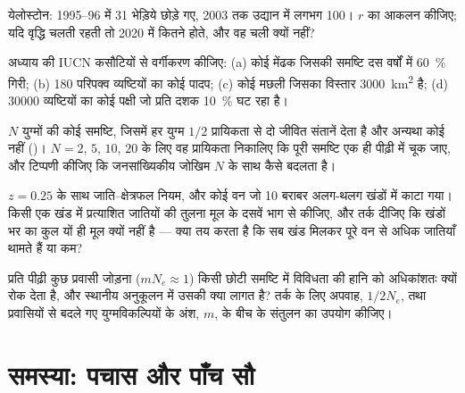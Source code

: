 \begin{exercise}[$\star\star$]\label{exo:b3:conservation-biology:8}
येलोस्टोन: 1995--96 में 31 भेड़िये छोड़े गए, 2003 तक उद्यान में लगभग
100। $r$ का आकलन कीजिए; यदि वृद्धि चलती रहती तो 2020 में कितने होते, और
वह चली क्यों नहीं?
\end{exercise}

\begin{exercise}[$\star\star$]\label{exo:b3:conservation-biology:9}
अध्याय की IUCN कसौटियों से वर्गीकरण कीजिए: (a) कोई मेंढक जिसकी समष्टि दस
वर्षों में \qty{60}{\%} गिरी; (b) 180 परिपक्व व्यष्टियों का कोई पादप;
(c) कोई मछली जिसका विस्तार \qty{3000}{km^2} है; (d) \num{30000}
व्यष्टियों का कोई पक्षी जो प्रति दशक \qty{10}{\%} घट रहा है।
\end{exercise}

\begin{exercise}[$\star\star\star$]\label{exo:b3:conservation-biology:10}
$N$ युग्मों की कोई समष्टि, जिसमें हर युग्म $1/2$ प्रायिकता से दो जीवित
संतानें देता है और अन्यथा कोई नहीं ()।
$N = 2$, $5$, $10$, $20$ के लिए वह प्रायिकता निकालिए कि पूरी समष्टि एक
ही पीढ़ी में चूक जाए, और टिप्पणी कीजिए कि जनसांख्यिकीय जोखिम $N$ के साथ
कैसे बदलता है।
\end{exercise}

\begin{exercise}[$\star\star\star$]\label{exo:b3:conservation-biology:11}
$z = 0.25$ के साथ जाति--क्षेत्रफल नियम, और कोई वन जो 10 बराबर अलग-थलग
खंडों में काटा गया। किसी एक खंड में प्रत्याशित जातियों की तुलना मूल के
दसवें भाग से कीजिए, और तर्क दीजिए कि खंडों भर का कुल यों ही मूल क्यों
नहीं है --- क्या तय करता है कि सब खंड मिलकर पूरे वन से अधिक जातियाँ
थामते हैं या कम?
\end{exercise}

\begin{exercise}[$\star\star\star$]\label{exo:b3:conservation-biology:12}
प्रति पीढ़ी कुछ प्रवासी जोड़ना ($m N_{e} \approx 1$) किसी छोटी समष्टि
में विविधता की हानि को अधिकांशतः क्यों रोक देता है, और स्थानीय अनुकूलन
में उसकी क्या लागत है? तर्क के लिए अपवाह, $1/2N_{e}$, तथा प्रवासियों से
बदले गए युग्मविकल्पियों के अंश, $m$, के बीच के संतुलन का उपयोग कीजिए।
\end{exercise}

\section{समस्या: पचास और पाँच सौ}

